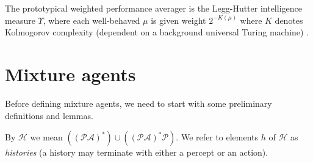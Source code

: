 \documentclass[runningheads]{llncs}
\begin{document}
The prototypical weighted performance averager is the Legg-Hutter intelligence
measure $\Upsilon$, where each well-behaved $\mu$ is given weight $2^{-K(\mu)}$
where $K$ denotes Kolmogorov complexity (dependent on a background universal
Turing machine) \cite{legg2007universal}.

\section{Mixture agents}

Before defining mixture agents, we need to start with some preliminary definitions
and lemmas.

\begin{definition}
    By $\mathcal H$ we mean
    $((\mathcal P\mathcal A)^*)\cup((\mathcal P\mathcal A)^*\mathcal P)$.
    We refer to elements $h$ of $\mathcal H$ as \emph{histories} (a history
    may terminate with either a percept or an action).
\end{definition}
\end{document}
